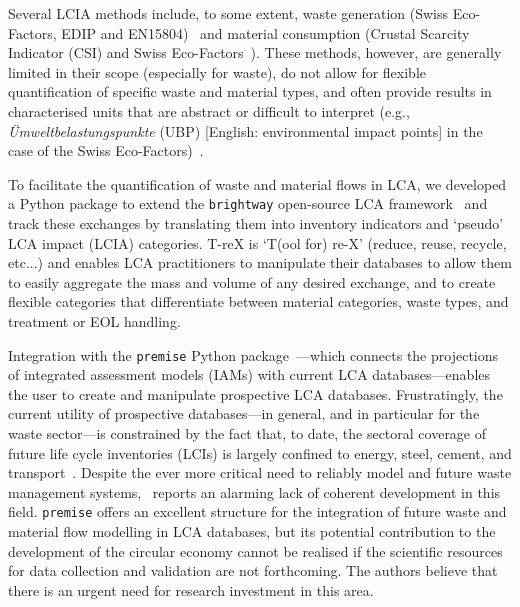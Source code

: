 \documentclass[a4paper,fleqn,longmktitle]{cas-dc}
\begin{document}
Several LCIA methods include, to some extent, waste generation (Swiss Eco-Factors, EDIP and EN15804)~\citep{foen2021ecofactors,hauschild2003edip,cen2019en15804} and material consumption (Crustal Scarcity Indicator (CSI) and Swiss Eco-Factors~\citep{arvidsson2020csi,foen2021ecofactors}). These methods, however, are generally limited in their scope (especially for waste), do not allow for flexible quantification of specific waste and material types, and often provide results in characterised units that are abstract or difficult to interpret (e.g., \textit{Ümweltbelastungspunkte} (UBP) [English: environmental impact points] in the case of the Swiss Eco-Factors)~\citep{su2020sustainableproddev}.

To facilitate the quantification of waste and material flows in LCA, we developed a Python package to extend the \texttt{brightway} open-source LCA framework~\citep{mutel2017brightway} and track these exchanges by translating them into inventory indicators and `pseudo' LCA impact (LCIA) categories. T-reX is `T(ool for) re-X' (reduce, reuse, recycle, etc...) and enables LCA practitioners to manipulate their databases to allow them to easily aggregate the mass and volume of any desired exchange, and to create flexible categories that differentiate between material categories, waste types, and treatment or EOL handling.

Integration with the \texttt{premise} Python package~\citep{sacchi2022premise}---which connects the projections of integrated assessment models (IAMs) with current LCA databases---enables the user to create and manipulate prospective LCA databases. Frustratingly, the current utility of prospective databases---in general, and in particular for the waste sector---is constrained by the fact that, to date, the sectoral coverage of future life cycle inventories (LCIs) is largely confined to energy, steel, cement, and transport~\citep{sacchi2023premisedocs}. Despite the ever more critical need to reliably model and future waste management systems,~\cite{bisinella2024wastelca} reports an alarming lack of coherent development in this field. \texttt{premise} offers an excellent structure for the integration of future waste and material flow modelling in LCA databases, but its potential contribution to the development of the circular economy cannot be realised if the scientific resources for data collection and validation are not forthcoming. The authors believe that there is an urgent need for research investment in this area.
\end{document}
